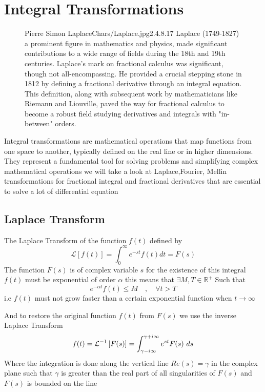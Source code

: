 \section{Integral Transformations}
\begin{figure*}[b]
    \begin{minipage}[h]{\textwidth}
        \begin{enrichment}{Pierre Simon Laplace}{Chars/Laplace.jpg}{2.4}{.8}{.17}
            Laplace (1749-1827) a prominent figure in mathematics and physics, made significant contributions to a wide range of fields during the 18th and 19th centuries. 
            Laplace's mark on fractional calculus was significant, though not all-encompassing.  He provided a crucial stepping stone in 1812 by defining a fractional derivative through an integral equation. This definition, along with subsequent work by mathematicians like Riemann and Liouville, paved the way for fractional calculus to become a robust field studying derivatives and integrals with "in-between" orders.
        \end{enrichment} 
    \end{minipage}
\end{figure*}
Integral transformations are mathematical operations that map functions from one space to another, 
typically defined on the real line or in higher dimensions. They represent a fundamental tool for solving problems and simplifying complex mathematical operations
we will take a look at Laplace,Fourier, Mellin transformations for fractional integral and fractional derivatives that are 
essential to solve a lot of differential equation 
\subsection{Laplace Transform}
The Laplace Transform of the function $f(t)$ defined by 
\begin{equation}
    \mathcal{L}\left[ f(t) \right] = \int_{0}^{\infty} e^{-st} f(t) dt = F(s)
\end{equation}
The function $F(s)$ is of complex variable $s$ for the existence of 
this integral $f(t)$ must be exponential of order $\alpha$ this means 
that $\exists M,T \in \mathbb{R}^+$ Such that
\[
e^{-\alpha t} f(t) \leq M \quad,\quad \forall t > T
\]
i.e $f(t)$ must not grow faster than a certain exponential function when $t \to \infty$

And to restore the original function $f(t)$ from $F(s)$ we use the inverse Laplace Transform
\[
f(t) = \mathcal{L}^{-1}\left[ F(s) \right] = \int_{\gamma-i\infty}^{\gamma+i\infty} e^{st} F(s) \,\, ds 
\]
Where the integration is done along the vertical line $ Re(s)=\gamma$ in the complex plane such that 
$\gamma$ is greater than the real part of all singularities of $F(s)$ and $F(s)$ is bounded on the line

